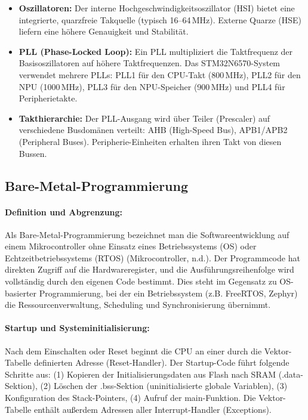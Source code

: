 \begin{itemize}
    \item \textbf{Oszillatoren:} Der interne Hochgeschwindigkeitsoszillator (HSI) bietet eine integrierte, quarzfreie Takquelle (typisch 16--64\,MHz). Externe Quarze (HSE) liefern eine höhere Genauigkeit und Stabilität.
    \item \textbf{PLL (Phase-Locked Loop):} Ein PLL multipliziert die Taktfrequenz der Basisoszillatoren auf höhere Taktfrequenzen. Das STM32N6570-System verwendet mehrere PLLs: PLL1 für den CPU-Takt (800\,MHz), PLL2 für den NPU (1000\,MHz), PLL3 für den NPU-Speicher (900\,MHz) und PLL4 für Peripherietakte.
    \item \textbf{Takthierarchie:} Der PLL-Ausgang wird über Teiler (Prescaler) auf verschiedene Busdomänen verteilt: AHB (High-Speed Bus), APB1/APB2 (Peripheral Buses). Peripherie-Einheiten erhalten ihren Takt von diesen Bussen.
\end{itemize}

\subsection{Bare-Metal-Programmierung}

\paragraph{Definition und Abgrenzung:}
Als Bare-Metal-Programmierung bezeichnet man die Softwareentwicklung auf einem Mikrocontroller ohne Einsatz eines Betriebssystems (OS) oder Echtzeitbetriebssystems (RTOS) (Mikrocontroller, n.d.). Der Programmcode hat direkten Zugriff auf die Hardwareregister, und die Ausführungsreihenfolge wird vollständig durch den eigenen Code bestimmt. Dies steht im Gegensatz zu OS-basierter Programmierung, bei der ein Betriebssystem (z.B. FreeRTOS, Zephyr) die Ressourcenverwaltung, Scheduling und Synchronisierung übernimmt.

\paragraph{Startup und Systeminitialisierung:}
Nach dem Einschalten oder Reset beginnt die CPU an einer durch die Vektor-Tabelle definierten Adresse (Reset-Handler). Der Startup-Code führt folgende Schritte aus: (1) Kopieren der Initialisierungsdaten aus Flash nach SRAM (.data-Sektion), (2) Löschen der .bss-Sektion (uninitialisierte globale Variablen), (3) Konfiguration des Stack-Pointers, (4) Aufruf der main-Funktion. Die Vektor-Tabelle enthält außerdem Adressen aller Interrupt-Handler (Exceptions).

